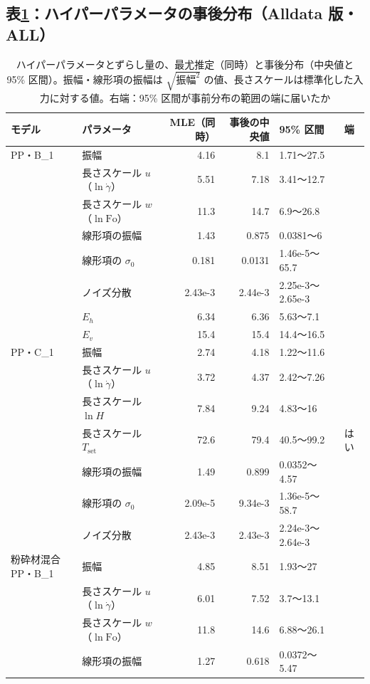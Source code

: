 \documentclass[paper=a4paper,fontsize=10.5pt,line_length=44zw,number_of_lines=38]{jlreq}
\newcommand{\gd}{\dot{\gamma}}
\newcommand{\Tset}{T_{\mathrm{set}}}
\newcommand{\Eh}{E_{h}}
\newcommand{\Ev}{E_{v}}
\begin{document}
\subsection{表\ref{tab:hp}：ハイパーパラメータの事後分布（Alldata 版・ALL）}
\begin{table}[H]
\caption{ハイパーパラメータとずらし量の、最尤推定（同時）と事後分布（中央値と 95\% 区間）。振幅・線形項の振幅は $\sqrt{\text{振幅}^2}$ の値、長さスケールは標準化した入力に対する値。右端：95\% 区間が事前分布の範囲の端に届いたか}\label{tab:hp}
\scriptsize
\begin{tabularx}{\linewidth}{@{}llrrXl@{}}
\toprule
モデル & パラメータ & MLE（同時） & 事後の中央値 & 95\% 区間 & 端 \\
\midrule
PP・B\_1 & 振幅 & 4.16 & 8.1 & 1.71〜27.5 &  \\
 & 長さスケール $u$（$\ln\gd$） & 5.51 & 7.18 & 3.41〜12.7 &  \\
 & 長さスケール $w$（$\ln\mathrm{Fo}$） & 11.3 & 14.7 & 6.9〜26.8 &  \\
 & 線形項の振幅 & 1.43 & 0.875 & 0.0381〜6 &  \\
 & 線形項の $\sigma_0$ & 0.181 & 0.0131 & 1.46e-5〜65.7 &  \\
 & ノイズ分散 & 2.43e-3 & 2.44e-3 & 2.25e-3〜2.65e-3 &  \\
 & $\Eh$ & 6.34 & 6.36 & 5.63〜7.1 &  \\
 & $\Ev$ & 15.4 & 15.4 & 14.4〜16.5 &  \\
\midrule
PP・C\_1 & 振幅 & 2.74 & 4.18 & 1.22〜11.6 &  \\
 & 長さスケール $u$（$\ln\gd$） & 3.72 & 4.37 & 2.42〜7.26 &  \\
 & 長さスケール $\ln H$ & 7.84 & 9.24 & 4.83〜16 &  \\
 & 長さスケール $\Tset$ & 72.6 & 79.4 & 40.5〜99.2 & はい \\
 & 線形項の振幅 & 1.49 & 0.899 & 0.0352〜4.57 &  \\
 & 線形項の $\sigma_0$ & 2.09e-5 & 9.34e-3 & 1.36e-5〜58.7 &  \\
 & ノイズ分散 & 2.43e-3 & 2.43e-3 & 2.24e-3〜2.64e-3 &  \\
\midrule
粉砕材混合 PP・B\_1 & 振幅 & 4.85 & 8.51 & 1.93〜27 &  \\
 & 長さスケール $u$（$\ln\gd$） & 6.01 & 7.52 & 3.7〜13.1 &  \\
 & 長さスケール $w$（$\ln\mathrm{Fo}$） & 11.8 & 14.6 & 6.88〜26.1 &  \\
 & 線形項の振幅 & 1.27 & 0.618 & 0.0372〜5.47 &  \\

\end{tabularx}
\end{table}
\end{document}
